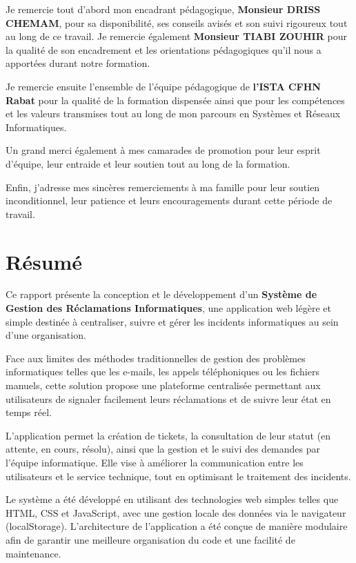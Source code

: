 \documentclass[12pt,a4paper,twoside]{report}
\begin{document}
Je remercie tout d'abord mon encadrant pédagogique, \textbf{Monsieur DRISS CHEMAM}, pour sa disponibilité, ses conseils avisés et son suivi rigoureux tout au long de ce travail. Je remercie également \textbf{Monsieur TIABI ZOUHIR} pour la qualité de son encadrement et les orientations pédagogiques qu'il nous a apportées durant notre formation.

Je remercie ensuite l'ensemble de l'équipe pédagogique de \textbf{l'ISTA CFHN Rabat} pour la qualité de la formation dispensée ainsi que pour les compétences et les valeurs transmises tout au long de mon parcours en Systèmes et Réseaux Informatiques.

Un grand merci également à mes camarades de promotion pour leur esprit d'équipe, leur entraide et leur soutien tout au long de la formation.

Enfin, j'adresse mes sincères remerciements à ma famille pour leur soutien inconditionnel, leur patience et leurs encouragements durant cette période de travail.

\chapter*{Résumé}

\vspace*{1cm}

Ce rapport présente la conception et le développement d'un \textbf{Système de Gestion des Réclamations Informatiques}, une application web légère et simple destinée à centraliser, suivre et gérer les incidents informatiques au sein d'une organisation.

Face aux limites des méthodes traditionnelles de gestion des problèmes informatiques telles que les e-mails, les appels téléphoniques ou les fichiers manuels, cette solution propose une plateforme centralisée permettant aux utilisateurs de signaler facilement leurs réclamations et de suivre leur état en temps réel.

L'application permet la création de tickets, la consultation de leur statut (en attente, en cours, résolu), ainsi que la gestion et le suivi des demandes par l'équipe informatique. Elle vise à améliorer la communication entre les utilisateurs et le service technique, tout en optimisant le traitement des incidents.

Le système a été développé en utilisant des technologies web simples telles que HTML, CSS et JavaScript, avec une gestion locale des données via le navigateur (localStorage). L'architecture de l'application a été conçue de manière modulaire afin de garantir une meilleure organisation du code et une facilité de maintenance.
\end{document}
